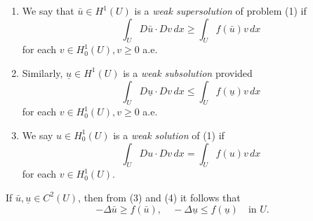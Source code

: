 \begin{definition}
\label{def:weak-sub-supersolution}
\begin{enumerate}
\item[(i)] We say that $\bar{u} \in H^1(U)$ is a \textit{weak supersolution} of problem (1) if
\[
\int_U D\bar{u} \cdot Dv \, dx \geq \int_U f(\bar{u})v \, dx
\tag{3}
\]
for each $v \in H^1_0(U), v \geq 0$ a.e.
\item[(ii)] Similarly, $\underline{u} \in H^1(U)$ is a \textit{weak subsolution} provided
\[
\int_U D\underline{u} \cdot Dv \, dx \leq \int_U f(\underline{u})v \, dx
\tag{4}
\]
for each $v \in H^1_0(U), v \geq 0$ a.e.
\item[(iii)] We say $u \in H^1_0(U)$ is a \textit{weak solution} of (1) if
\[
\int_U Du \cdot Dv \, dx = \int_U f(u)v \, dx
\]
for each $v \in H^1_0(U)$.
\end{enumerate}
\end{definition}

\begin{remark}
\label{rem:sub-supersolution-c2-case}
If $\bar{u}, \underline{u} \in C^2(U)$, then from (3) and (4) it follows that
\[
-\Delta \bar{u} \geq f(\bar{u}), \quad -\Delta \underline{u} \leq f(\underline{u}) \quad \text{in } U.
\]
\end{remark}

